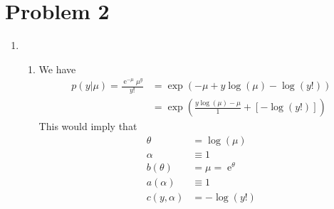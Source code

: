 \documentclass[11pt]{article}
\newcommand*\ba{\[ \begin{aligned}}
\newcommand*\ea{\end{aligned} \]}
\newcommand\e{\operatorname{e}}
\renewcommand\;{\,}
\begin{document}
\section*{Problem 2}
\begin{enumerate}[label=(\alph*)]
\item
\begin{enumerate}[label=(\roman*)]
\item
We have
\ba
p(y|\mu) = \frac{ \e^{-\mu} \mu^y }{ y! } 
	& = \exp\left( -\mu + y \log(\mu) - \log(y!) \right) \\
	& = \exp\left( \frac{y \log(\mu) - \mu}{1} + \left[-\log(y!)\right] \right)
\ea
This would imply that
\ba
\theta & = \log(\mu) \\
\alpha & \equiv 1 \\
b(\theta) & = \mu = \e^\theta \\
a(\alpha) & \equiv 1 \\
c(y, \alpha) & = -\log(y!)
\ea


\end{enumerate}
\end{enumerate}
\end{document}
